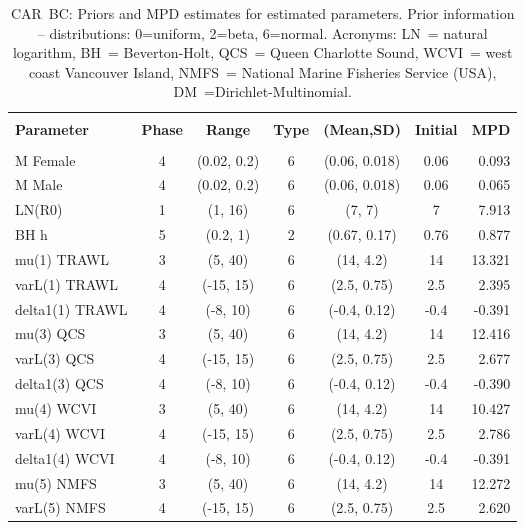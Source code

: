 \newpage
{}

\setlength{\tabcolsep}{2pt}
\begin{table}[!h]
\centering
\caption{CAR~BC: Priors and MPD estimates for estimated parameters. Prior information -- distributions: 0=uniform, 2=beta, 6=normal. Acronyms: LN~= natural logarithm, BH~= Beverton-Holt, QCS~= Queen Charlotte Sound, WCVI~= west coast Vancouver Island, NMFS~= National Marine Fisheries Service (USA), DM~=Dirichlet-Multinomial.}
\label{tab:car.parest}
\usefont{\encodingdefault}{\familydefault}{\seriesdefault}{\shapedefault}\small
\begin{tabular}{lcccccr}
\hline \\ [-1.5ex]
{\bf Parameter} & {\bf Phase} & {\bf Range} & {\bf Type} & {\bf (Mean,SD)} & {\bf Initial} & {\bf MPD} \\ [1ex]
\hline \\ [-1.5ex]
M Female & 4 & (0.02, 0.2) & 6 & (0.06, 0.018) & 0.06 & 0.093 \\
M Male & 4 & (0.02, 0.2) & 6 & (0.06, 0.018) & 0.06 & 0.065 \\
LN(R0) & 1 & (1, 16) & 6 & (7, 7) & 7 & 7.913 \\
BH h & 5 & (0.2, 1) & 2 & (0.67, 0.17) & 0.76 & 0.877 \\
mu(1) TRAWL & 3 & (5, 40) & 6 & (14, 4.2) & 14 & 13.321 \\
varL(1) TRAWL & 4 & (-15, 15) & 6 & (2.5, 0.75) & 2.5 & 2.395 \\
delta1(1) TRAWL & 4 & (-8, 10) & 6 & (-0.4, 0.12) & -0.4 & -0.391 \\
mu(3) QCS & 3 & (5, 40) & 6 & (14, 4.2) & 14 & 12.416 \\
varL(3) QCS & 4 & (-15, 15) & 6 & (2.5, 0.75) & 2.5 & 2.677 \\
delta1(3) QCS & 4 & (-8, 10) & 6 & (-0.4, 0.12) & -0.4 & -0.390 \\
mu(4) WCVI & 3 & (5, 40) & 6 & (14, 4.2) & 14 & 10.427 \\
varL(4) WCVI & 4 & (-15, 15) & 6 & (2.5, 0.75) & 2.5 & 2.786 \\
delta1(4) WCVI & 4 & (-8, 10) & 6 & (-0.4, 0.12) & -0.4 & -0.391 \\
mu(5) NMFS & 3 & (5, 40) & 6 & (14, 4.2) & 14 & 12.272 \\
varL(5) NMFS & 4 & (-15, 15) & 6 & (2.5, 0.75) & 2.5 & 2.620 \\

\end{tabular}
\end{table}
